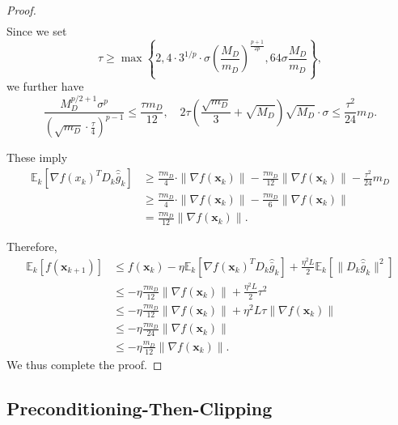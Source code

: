 \documentclass{article}
\newcommand{\bx}{\boldsymbol{x}}
\newcommand{\barg}{\bar{g}}
\theoremstyle{plain}
\theoremstyle{definition}
\theoremstyle{remark}
\begin{document}
\begin{proof}
\begin{align*}
\end{align*}
Since we set 
\begin{equation*}
    \tau \geq \max\left\{2,  4\cdot 3^{1/p}\cdot \sigma\left(\frac{M_D}{m_D}\right)^{\frac{p+1}{2p}}, 64 \sigma \frac{M_D}{m_D} \right\},
\end{equation*}
we further have
\begin{equation*}
    \frac{M_D^{p/2+1} \sigma^p}{\left(\sqrt{m_D}\cdot\frac{\tau}{4}\right)^{p-1}} \leq \frac{\tau m_D}{12}, \quad 2\tau \left( \frac{\sqrt{m_D}}{3} + \sqrt{M_D}\right) \sqrt{M_D} \cdot \sigma \leq \frac{\tau^2}{24}m_D.
\end{equation*}

These imply
\begin{align*}
    \mathbb{E}_k[\nabla f(x_k)^T D_k \widehat{\barg}_k ]
    & \geq   \frac{\tau m_D}{4} \cdot \| \nabla f(\bx_k)\| -  \frac{\tau m_D}{12}\|\nabla f(\bx_k)\| - \frac{\tau^2}{24}m_D\\
    & \geq \frac{\tau m_D}{4} \cdot \| \nabla f(\bx_k)\| -  \frac{\tau m_D}{6}\|\nabla f(\bx_k)\|\\
    & = \frac{\tau m_D}{12}\|\nabla f(\bx_k)\|.
\end{align*}

Therefore, 
 \begin{align*}
\mathbb{E}_k[f(\bx_{k+1})]  & \leq f(\bx_k) - \eta  \mathbb{E}_k[\nabla f(\bx_k)^T D_k\widehat{\barg}_k] + \frac{\eta^2 L }{2} \mathbb{E}_k[\|D_k\widehat{\barg}_k\|^2]\\
& \leq - \eta \frac{\tau m_D}{12}\|\nabla f(\bx_k)\| + \frac{\eta^2 L }{2}\tau^2 \\
& \leq - \eta \frac{\tau m_D}{12}\|\nabla f(\bx_k)\| + \eta^2 L  \tau \|\nabla f(\bx_k)\| \\
& \leq - \eta \frac{\tau m_D}{24}\|\nabla f(\bx_k)\| \\
& \leq - \eta \frac{ m_D}{12}\|\nabla f(\bx_k)\|.
\end{align*}
We thus complete the proof.
\end{proof}


\subsection{Preconditioning-Then-Clipping}
\end{document}
